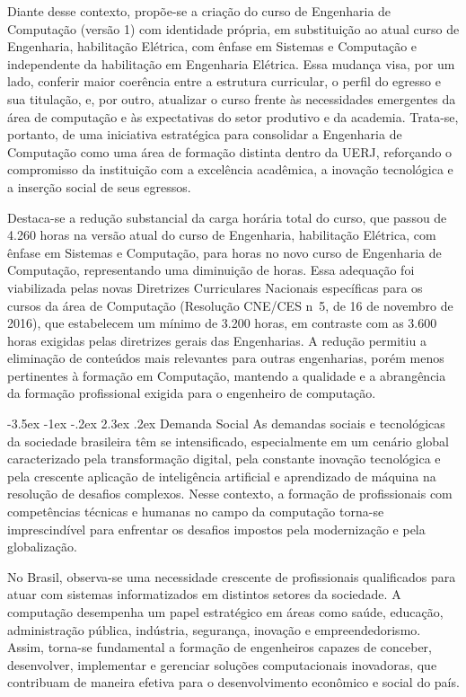 \documentclass[12pt,a4paper]{article}
\makeatletter
\renewcommand{\section}{\@startsection{section}{1}{\z@}%
      {-3.5ex \@plus -1ex \@minus -.2ex}%
      {2.3ex \@plus.2ex}%
      {\normalfont\normalsize\bfseries}}
\newcommand{\cursoatual}{Engenharia, habilitação Elétrica, com ênfase em Sistemas e Computação\xspace}
\makeatother
\begin{document}
Diante desse contexto, propõe-se a criação do curso de Engenharia de Computação (versão 1) com identidade própria, em substituição ao atual curso de \cursoatual e independente da habilitação em Engenharia Elétrica. Essa mudança visa, por um lado, conferir maior coerência entre a estrutura curricular, o perfil do egresso e sua titulação, e, por outro, atualizar o curso frente às necessidades emergentes da área de computação e às expectativas do setor produtivo e da academia. Trata-se, portanto, de uma iniciativa estratégica para consolidar a Engenharia de Computação como uma área de formação distinta dentro da UERJ, reforçando o compromisso da instituição com a excelência acadêmica, a inovação tecnológica e a inserção social de seus egressos.

Destaca-se a redução substancial da carga horária total do curso, que passou de 4.260 horas na versão atual do curso de \cursoatual, para \tHorasCurso horas no novo curso de Engenharia de Computação, representando uma diminuição de  horas. Essa adequação foi viabilizada pelas novas Diretrizes Curriculares Nacionais específicas para os cursos da área de Computação (Resolução CNE/CES n\textordmasculine{}~5, de 16 de novembro de 2016), que estabelecem um mínimo de 3.200 horas, em contraste com as 3.600 horas exigidas pelas diretrizes gerais das Engenharias. A redução permitiu a eliminação de conteúdos mais relevantes para outras engenharias, porém menos pertinentes à formação em Computação, mantendo a qualidade e a abrangência da formação profissional exigida para o engenheiro de computação.

\section{Demanda Social}
As demandas sociais e tecnológicas da sociedade brasileira têm se intensificado, especialmente em um cenário global caracterizado pela transformação digital, pela constante inovação tecnológica e pela crescente aplicação de inteligência artificial e aprendizado de máquina na resolução de desafios complexos. Nesse contexto, a formação de profissionais com competências técnicas e humanas no campo da computação torna-se imprescindível para enfrentar os desafios impostos pela modernização e pela globalização.

No Brasil, observa-se uma necessidade crescente de profissionais qualificados para atuar com sistemas informatizados em distintos setores da sociedade. A computação desempenha um papel estratégico em áreas como saúde, educação, administração pública, indústria, segurança, inovação e empreendedorismo. Assim, torna-se fundamental a formação de engenheiros capazes de conceber, desenvolver, implementar e gerenciar soluções computacionais inovadoras, que contribuam de maneira efetiva para o desenvolvimento econômico e social do país.
\end{document}
